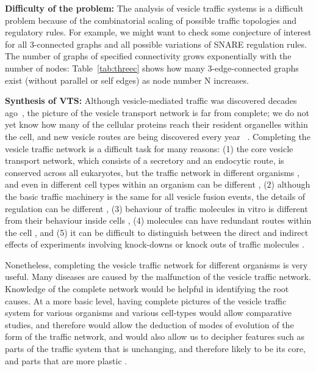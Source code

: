 \textbf{Difficulty of the problem:}
The analysis of vesicle traffic systems is a difficult problem
because of the combinatorial scaling of possible traffic topologies and regulatory rules. 
%
For example, we might want to check some conjecture of interest for all 3-connected graphs and
all possible variations of SNARE regulation rules. 
%
The number of graphs of specified connectivity grows exponentially with the number of nodes: Table~\ref{tab:threec} shows how many 3-edge-connected graphs~\cite{a052448-oeis} exist (without parallel or self edges) as node number N increases.

\textbf{Synthesis of VTS:}
Although vesicle-mediated traffic was discovered decades ago~\cite{wells2005discovery}, the picture of the vesicle transport network is far from complete; we do not yet know how many of the cellular proteins reach their resident organelles within the cell, and new vesicle routes are being discovered every year ~\cite{nickel2018unconventional,weill2018toolbox}. 
%
Completing the vesicle traffic network is a difficult task for many reasons: (1) the core vesicle transport network, which consists of a secretory and an endocytic route, is conserved across all eukaryotes, but the traffic network in different organisms \cite{richardson2015evolutionary,nishimoto2009differential,barlow2017seeing}, and even in different cell types within an organism can be different \cite{stoops2014trafficking,zhou2015arp2}, (2) although the basic traffic machinery is the same for all vesicle fusion events, the details of regulation can be different \cite{davletov2007regulation,di2010calcium}, (3) behaviour of traffic molecules in vitro is different from their behaviour inside cells \cite{furukawa2014multiple}, (4) molecules can have redundant routes within the cell \cite{shimizu2014compensatory,nakatsukasa2014nutrient}, and (5) it can be difficult to distinguish between the direct and indirect effects of experiments involving knock-downs or knock outs of traffic molecules \cite{hirst2004epsinr,mishev2013small}.

Nonetheless, completing the vesicle traffic network for different organisms is very useful. Many diseases are caused by the malfunction of the vesicle traffic network. Knowledge of the complete network would be helpful in identifying the root causes\cite{bexiga2013human,gissen2007cargos}. At a more basic level, having complete pictures of the vesicle traffic system for various organisms and various cell-types would allow comparative studies, and therefore would allow the deduction of modes of evolution of the form of the traffic network, and would also allow us to decipher features such as parts of the traffic system that is unchanging, and therefore likely to be its core, and parts that are more plastic \cite{barlow2017seeing}.

